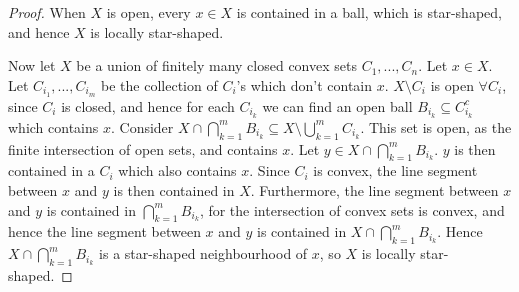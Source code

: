 \documentclass{article}
\begin{document}
\begin{proof}
When $X$ is open, every $x\in X$ is contained in a ball, which is star-shaped, and hence $X$ is locally star-shaped.

Now let $X$ be a union of finitely many closed convex sets $C_1,...,C_n$. Let $x\in X$. Let $C_{i_1},...,C_{i_m}$ be the collection of $C_i$'s which don't contain $x$. $X\setminus C_i$ is open $\forall C_i$, since $C_i$ is closed, and hence for each $C_{i_k}$ we can find an open ball $B_{i_k}\subseteq C_{i_k}^c$ which contains $x$. Consider $X\cap \bigcap_{k=1}^mB_{i_k}\subseteq X\setminus\bigcup_{k=1}^mC_{i_k}$. This set is open, as the finite intersection of open sets, and contains $x$. Let $y\in X\cap \bigcap_{k=1}^mB_{i_k}$. $y$ is then contained in a $C_i$ which also contains $x$. Since $C_i$ is convex, the line segment between $x$ and $y$ is then contained in $X$. Furthermore, the line segment between $x$ and $y$ is contained in $\bigcap_{k=1}^mB_{i_k}$, for the intersection of convex sets is convex, and hence the line segment between $x$ and $y$ is contained in $X\cap \bigcap_{k=1}^mB_{i_k}$. Hence $X\cap \bigcap_{k=1}^mB_{i_k}$ is a star-shaped neighbourhood of $x$, so $X$ is locally star-shaped.
\end{proof}
\end{document}

